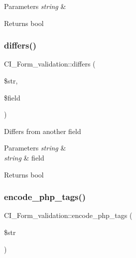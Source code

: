 \begin{DoxyParams}{Parameters}
{\em string} & \\
\hline
\end{DoxyParams}
\begin{DoxyReturn}{Returns}
bool 
\end{DoxyReturn}
\mbox{\label{class_c_i___form__validation_ac4bab1eaa84f89bcaaf943e775f27927}} 
\subsubsection{\texorpdfstring{differs()}{differs()}}
{\footnotesize\ttfamily C\+I\+\_\+\+Form\+\_\+validation\+::differs (\begin{DoxyParamCaption}\item[{}]{\$str,  }\item[{}]{\$field }\end{DoxyParamCaption})}

Differs from another field


\begin{DoxyParams}{Parameters}
{\em string} & \\
\hline
{\em string} & field \\
\hline
\end{DoxyParams}
\begin{DoxyReturn}{Returns}
bool 
\end{DoxyReturn}
\mbox{\label{class_c_i___form__validation_a02e45774b9bcc341aefc5bf1b55f0e38}} 
\subsubsection{\texorpdfstring{encode\+\_\+php\+\_\+tags()}{encode\_php\_tags()}}
{\footnotesize\ttfamily C\+I\+\_\+\+Form\+\_\+validation\+::encode\+\_\+php\+\_\+tags (\begin{DoxyParamCaption}\item[{}]{\$str }\end{DoxyParamCaption})}

